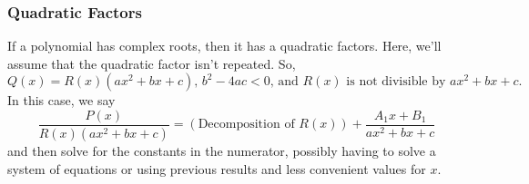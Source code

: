\subsubsection{Quadratic Factors}

If a polynomial has complex roots, then it has a quadratic factors.
Here, we'll assume that the quadratic factor isn't repeated. 
So,
\begin{equation*}
	Q(x) = R(x)(ax^2+bx+c)\text{, }b^2-4ac < 0\text{, and }R(x)\text{ is not divisible by }ax^2+bx+c.
\end{equation*}
In this case, we say
\begin{equation*}
	\frac{P(x)}{R(x)(ax^2+bx+c)} = \left(\text{Decomposition of }R(x)\right)+\frac{A_1x+B_1}{ax^2+bx+c}
\end{equation*}
and then solve for the constants in the numerator, possibly having to solve a system of equations or using previous results and less convenient values for $x$.

